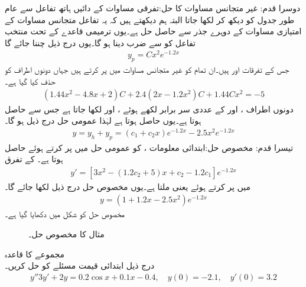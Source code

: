 دوسرا قدم: غیر متجانس مساوات کا حل:\quad تفرقی مساوات کے دائیں ہاتھ تفاعل  سے عام طور جدول  کو دیکھ کر  لکھا جاتا البتہ ہم دیکھتے ہیں کہ یہ تفاعل متجانس مساوات کے امتیازی مساوات کے دوہرے جذر سے حاصل حل ہے۔یوں ترمیمی قاعدے کے تحت منتخب تفاعل کو  سے ضرب دینا ہو گا۔یوں درج ذیل چننا جائے گا
\begin{align*}
y_p=Cx^2e^{-1.2x}
\end{align*}
جس کے تفرقات  اور  ہیں۔ان تمام  کو غیر متجانس مساوات میں پر کرتے ہیں جہاں دونوں اطراف  کو حذف کیا گیا ہے۔
\begin{align*}
(1.44x^2-4.8x+2)C+2.4(2x-1.2x^2)C+1.44Cx^2=-5
\end{align*}
دونوں اطراف ،  اور  کے عددی سر برابر لکھے ہوئے ،  اور  لکھا جاتا ہے جس سے  حاصل ہوتا ہے۔یوں  حاصل ہوتا ہے لہٰذا عمومی حل درج ذیل ہو گا۔
 \begin{align*}
y=y_h+y_p=(c_1+c_2x)e^{-1.2x}-2.5x^2e^{-1.2x}
\end{align*}
تیسرا قدم: مخصوص حل:\quad ابتدائی معلومات ،   کو عمومی حل میں پر کرتے ہوئے  حاصل ہوتا ہے۔ کے تفرق
\begin{align*}
y'=[3x^2-(1.2c_2+5)x+c_2-1.2c_1]e^{-1.2x}
\end{align*} 
 میں  پر کرتے  ہوئے  یعنی  ملتا ہے۔یوں مخصوص حل درج ذیل لکھا جائے گا۔
\begin{align*}
y=(1+1.2x-2.5x^2)e^{-1.2x}
\end{align*}
مخصوص حل کو شکل  میں دکھایا گیا ہے۔
\begin{figure}
\centering
{}
\caption{مثال  کا مخصوص حل۔}
\label{شکل_مثال_سادہ_دو_نا_معلوم_سر_ب}
\end{figure}
\quad مجموعے کا قاعدہ\\
درج ذیل ابتدائی قیمت مسئلے کو حل کریں۔
\begin{align*}
y''3y'+2y=0.2\cos x+0.1x-0.4, \quad y(0)=-2.1, \quad y'(0)=3.2
\end{align*}

